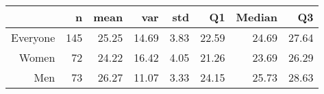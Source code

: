 \begin{table}[ht]
\centering
\begin{tabular}{rrrrrrrr}
  \hline
 & n & mean & var & std & Q1 & Median & Q3 \\ 
  \hline
Everyone & 145 & 25.25 & 14.69 & 3.83 & 22.59 & 24.69 & 27.64 \\ 
  Women &  72 & 24.22 & 16.42 & 4.05 & 21.26 & 23.69 & 26.29 \\ 
  Men &  73 & 26.27 & 11.07 & 3.33 & 24.15 & 25.73 & 28.63 \\ 
   \hline
\end{tabular}
\end{table}
